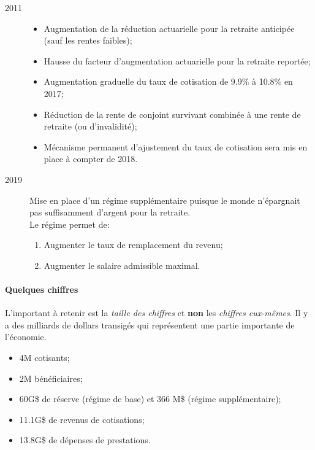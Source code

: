 \documentclass[10pt, french]{article}
\begin{document}
\begin{multicols*}{3}
\begin{rappel_enhanced}[Modifications]
\begin{description}
	\item[2011]	
		\begin{itemize}[leftmargin = *]
		\item	Augmentation de la réduction actuarielle pour la retraite anticipée (sauf les rentes faibles);
		\item	Hausse du facteur d'augmentation actuarielle pour la retraite reportée;
		\item	Augmentation graduelle du taux de cotisation de 9.9\% à 10.8\% en 2017;
		\item	Réduction de la rente de conjoint survivant combinée à une rente de retraite (ou d'invalidité);
		\item	Mécanisme permanent d'ajustement du taux de cotisation sera mis en place à compter de 2018.
		\end{itemize}
	\item[2019]	Mise en place d'un régime supplémentaire puisque le monde n'épargnait pas suffisamment d'argent pour la retraite. \\
				Le régime permet de:
			\begin{enumerate}[leftmargin = *]
			\item	Augmenter le taux de remplacement du revenu;
			\item	Augmenter le salaire admissible maximal.
			\end{enumerate}	
\end{description}
\end{rappel_enhanced}

\paragraph{Quelques chiffres}	L'important à retenir est la \textit{taille des chiffres} et \textbf{non} les \textit{chiffres eux-mêmes}. Il y a des milliards de dollars transigés qui représentent une partie importante de l'économie.\\

\begin{itemize}[leftmargin = *]
	\item	4M cotisants;
	\item	2M bénéficiaires;
	\item	60G\$ de réserve (régime de base) et 366 M\$ (régime supplémentaire);
	\item	11.1G\$ de revenus de cotisations;
	\item	13.8G\$ de dépenses de prestations.
\end{itemize}


\end{multicols*}
\end{document}
